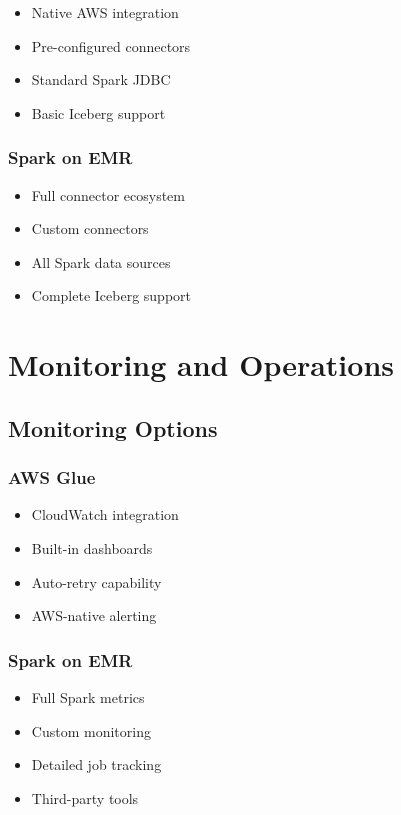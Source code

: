 \documentclass[
  letterpaper,
  DIV=11,
  numbers=noendperiod]{scrartcl}
\providecommand{\tightlist}{%
  \setlength{\itemsep}{0pt}\setlength{\parskip}{0pt}}\usepackage{longtable,booktabs,array}
\begin{document}
\begin{itemize}
\tightlist
\item
  Native AWS integration
\item
  Pre-configured connectors
\item
  Standard Spark JDBC
\item
  Basic Iceberg support
\end{itemize}

\subsubsection{Spark on EMR}

\begin{itemize}
\tightlist
\item
  Full connector ecosystem
\item
  Custom connectors
\item
  All Spark data sources
\item
  Complete Iceberg support
\end{itemize}

\section{Monitoring and Operations}\label{monitoring-and-operations}

\subsection{Monitoring Options}\label{monitoring-options}

\subsubsection{AWS Glue}

\begin{itemize}
\tightlist
\item
  CloudWatch integration
\item
  Built-in dashboards
\item
  Auto-retry capability
\item
  AWS-native alerting
\end{itemize}

\subsubsection{Spark on EMR}

\begin{itemize}
\tightlist
\item
  Full Spark metrics
\item
  Custom monitoring
\item
  Detailed job tracking
\item
  Third-party tools
\end{itemize}
\end{document}
